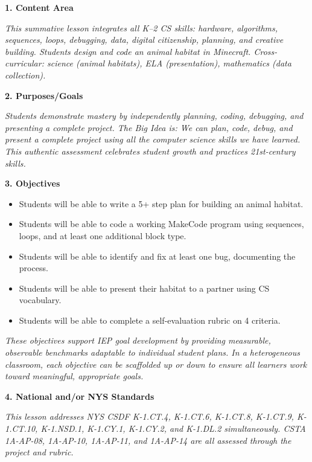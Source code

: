 \documentclass[11pt,letterpaper]{article}
\begin{document}
\textbf{1. Content Area}

\textit{This summative lesson integrates all K--2 CS skills: hardware, algorithms, sequences, loops, debugging, data, digital citizenship, planning, and creative building. Students design and code an animal habitat in Minecraft. Cross-curricular: science (animal habitats), ELA (presentation), mathematics (data collection).}

\textbf{2. Purposes/Goals}

\textit{Students demonstrate mastery by independently planning, coding, debugging, and presenting a complete project. The Big Idea is: We can plan, code, debug, and present a complete project using all the computer science skills we have learned. This authentic assessment celebrates student growth and practices 21st-century skills.}

\textbf{3. Objectives}

\begin{itemize}
  \item Students will be able to write a 5+ step plan for building an animal habitat.

  \item Students will be able to code a working MakeCode program using sequences, loops, and at least one additional block type.

  \item Students will be able to identify and fix at least one bug, documenting the process.

  \item Students will be able to present their habitat to a partner using CS vocabulary.

  \item Students will be able to complete a self-evaluation rubric on 4 criteria.
\end{itemize}

\textit{These objectives support IEP goal development by providing measurable, observable benchmarks adaptable to individual student plans. In a heterogeneous classroom, each objective can be scaffolded up or down to ensure all learners work toward meaningful, appropriate goals.}

\textbf{4. National and/or NYS Standards}

\textit{This lesson addresses NYS CSDF K-1.CT.4, K-1.CT.6, K-1.CT.8, K-1.CT.9, K-1.CT.10, K-1.NSD.1, K-1.CY.1, K-1.CY.2, and K-1.DL.2 simultaneously. CSTA 1A-AP-08, 1A-AP-10, 1A-AP-11, and 1A-AP-14 are all assessed through the project and rubric.}
\end{document}
